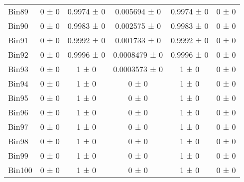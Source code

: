 \begin{tabular}{@{\extracolsep{4pt}}lccccc@{}}
     Bin89 & 0 ± 0 & 0.9974 ± 0 & 0.005694 ± 0 & 0.9974 ± 0 & 0 ± 0 \\ 
     Bin90 & 0 ± 0 & 0.9983 ± 0 & 0.002575 ± 0 & 0.9983 ± 0 & 0 ± 0 \\ 
     Bin91 & 0 ± 0 & 0.9992 ± 0 & 0.001733 ± 0 & 0.9992 ± 0 & 0 ± 0 \\ 
     Bin92 & 0 ± 0 & 0.9996 ± 0 & 0.0008479 ± 0 & 0.9996 ± 0 & 0 ± 0 \\ 
     Bin93 & 0 ± 0 & 1 ± 0 & 0.0003573 ± 0 & 1 ± 0 & 0 ± 0 \\ 
     Bin94 & 0 ± 0 & 1 ± 0 & 0 ± 0 & 1 ± 0 & 0 ± 0 \\ 
     Bin95 & 0 ± 0 & 1 ± 0 & 0 ± 0 & 1 ± 0 & 0 ± 0 \\ 
     Bin96 & 0 ± 0 & 1 ± 0 & 0 ± 0 & 1 ± 0 & 0 ± 0 \\ 
     Bin97 & 0 ± 0 & 1 ± 0 & 0 ± 0 & 1 ± 0 & 0 ± 0 \\ 
     Bin98 & 0 ± 0 & 1 ± 0 & 0 ± 0 & 1 ± 0 & 0 ± 0 \\ 
     Bin99 & 0 ± 0 & 1 ± 0 & 0 ± 0 & 1 ± 0 & 0 ± 0 \\ 
     Bin100 & 0 ± 0 & 1 ± 0 & 0 ± 0 & 1 ± 0 & 0 ± 0 \\ 
\hline\hline
  \end{tabular}
